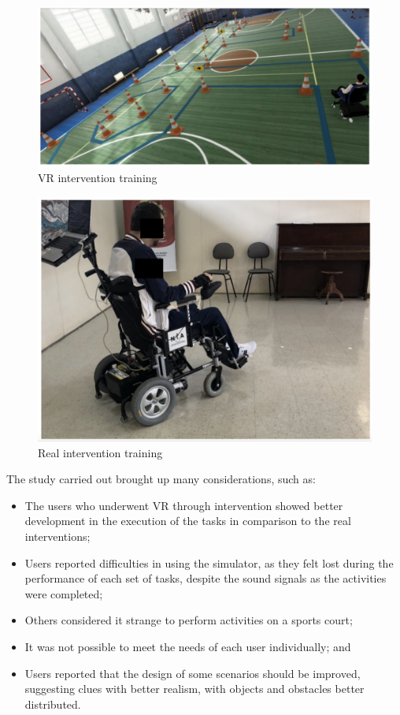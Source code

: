 \begin{figure}[!hbt]
\begin{center}
\includegraphics[width=1 \textwidth]{img/cap3/valentini2019virtual}
\caption{VR intervention training \cite{valentini2019}}
\label{fig:valentini2019virtual}
\end{center}
\end{figure}

\begin{figure}[!hbt]
\begin{center}
\includegraphics[width=0.8 \textwidth]{img/cap3/valentini2019real}
\caption{Real intervention training \cite{valentini2019}}
\label{fig:valentini2019real}
\end{center}
\end{figure}

The study carried out brought up many considerations, such as:

\begin{itemize}
\item The users who underwent VR through intervention showed better development in the execution of the tasks in comparison to the real interventions;
\item Users reported difficulties in using the simulator, as they felt lost during the performance of each set of tasks, despite the sound signals as the activities were completed;
\item Others considered it strange to perform activities on a sports court;
\item It was not possible to meet the needs of each user individually; and
\item Users reported that the design of some scenarios should be improved, suggesting clues with better realism, with objects and obstacles better distributed.
\end{itemize}


